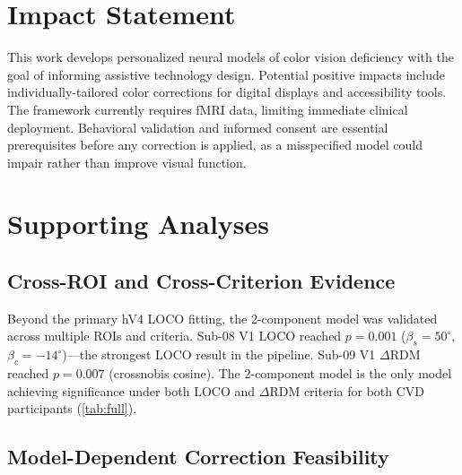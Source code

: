 \documentclass{article}
\begin{document}
\section*{Impact Statement}

This work develops personalized neural models of color vision deficiency with the goal of informing assistive technology design.
Potential positive impacts include individually-tailored color corrections for digital displays and accessibility tools.
The framework currently requires fMRI data, limiting immediate clinical deployment.
Behavioral validation and informed consent are essential prerequisites before any correction is applied, as a misspecified model could impair rather than improve visual function.




\newpage
\appendix
\onecolumn

\section{Supporting Analyses}
\label{app:supporting}

\subsection{Cross-ROI and Cross-Criterion Evidence}

Beyond the primary hV4 LOCO fitting, the 2-component model was validated across multiple ROIs and criteria.
Sub-08 V1 LOCO reached $p = 0.001$ ($\beta_s = 50^\circ$, $\beta_c = -14^\circ$)---the strongest LOCO result in the pipeline.
Sub-09 V1 $\Delta$RDM reached $p = 0.007$ (crossnobis cosine).
The 2-component model is the only model achieving significance under both LOCO and $\Delta$RDM criteria for both CVD participants (\cref{tab:full}).

\subsection{Model-Dependent Correction Feasibility}
\end{document}
